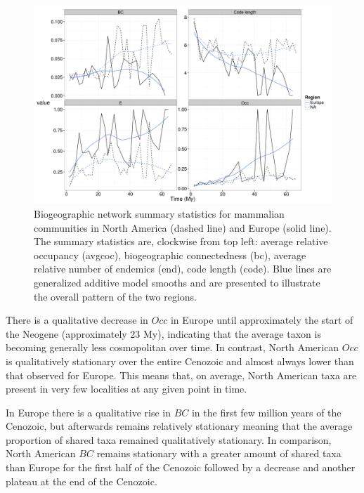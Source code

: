 \documentclass[12pt,letterpaper]{article}
\begin{document}
\begin{figure}[ht]
  \begin{center}
    \includegraphics[height = 0.4\textheight, keepaspectratio = true]{figure/gen_bin}
  \end{center}
  \caption{Biogeographic network summary statistics for mammalian communities in North America (dashed line) and Europe (solid line). The summary statistics are, clockwise from top left: average relative occupancy (avgcoc), biogeographic connectedness (bc), average relative number of endemics (end), code length (code). Blue lines are generalized additive model smooths and are presented to illustrate the overall pattern of the two regions.} 
  \label{fig:mam_tot}
\end{figure}

There is a qualitative decrease in \(Occ\) in Europe until approximately the start of the Neogene (approximately 23 My), indicating that the average taxon is becoming generally less cosmopolitan over time. In contrast, North American \(Occ\) is qualitatively stationary over the entire Cenozoic and almost always lower than that observed for Europe. This means that, on average, North American taxa are present in very few localities at any given point in time.

In Europe there is a qualitative rise in \(BC\) in the first few million years of the Cenozoic, but afterwards remains relatively stationary meaning that the average proportion of shared taxa remained qualitatively stationary. In comparison, North American \(BC\) remains stationary with a greater amount of shared taxa than Europe for the first half of the Cenozoic followed by a decrease and another plateau at the end of the Cenozoic.
\end{document}
